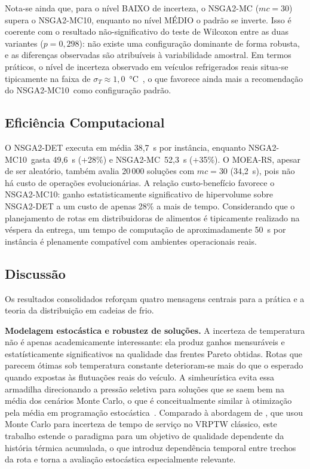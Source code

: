 \documentclass[a4paper,11pt]{article}
\newcommand{\nsmc}{NSGA2\mbox{-}MC\xspace}
\newcommand{\nsmx}{NSGA2\mbox{-}MC10\xspace}
\newcommand{\nsdet}{NSGA2\mbox{-}DET\xspace}
\newcommand{\moers}{MOEA\mbox{-}RS\xspace}
\begin{document}
Nota-se ainda que, para o nível BAIXO de incerteza, o NSGA2-MC ($mc=30$)
supera o NSGA2-MC10, enquanto no nível MÉDIO o padrão se inverte.
Isso é coerente com o resultado não-significativo do teste de Wilcoxon
entre as duas variantes ($p=0{,}298$): não existe uma configuração
dominante de forma robusta, e as diferenças observadas são atribuíveis
à variabilidade amostral.
Em termos práticos, o nível de incerteza observado em veículos refrigerados
reais situa-se tipicamente na faixa de $\sigma_T \approx 1{,}0$~°C~\citep{taoukis:1997},
o que favorece ainda mais a recomendação do \nsmx~como configuração padrão.

\subsection{Efici\^encia Computacional}

O \nsdet executa em média 38,7~s por inst\^ancia, enquanto \nsmx~gasta
49,6~s (+28\%) e \nsmc~52,3~s (+35\%).
O \moers, apesar de ser aleatório, também avalia 20\,000 soluções com
$mc=30$ (34,2~s), pois não há custo de operações evolucionárias.
A relação custo-benefício favorece o \nsmx: ganho estatisticamente
significativo de hipervolume sobre \nsdet a um custo de apenas 28\% a mais
de tempo.
Considerando que o planejamento de rotas em distribuidoras de alimentos é
tipicamente realizado na véspera da entrega, um tempo de computação de
aproximadamente 50~s por inst\^ancia é plenamente compatível com
ambientes operacionais reais.

\subsection{Discussão}

Os resultados consolidados reforçam quatro mensagens centrais para a prática
e a teoria da distribuição em cadeias de frio.

\textbf{Modelagem estocástica e robustez de soluções.}
A incerteza de temperatura não é apenas academicamente interessante:
ela produz ganhos mensuráveis e estatísticamente significativos na qualidade
das frentes Pareto obtidas.
Rotas que parecem ótimas sob temperatura constante deterioram-se mais do
que o esperado quando expostas às flutuações reais do veículo.
A simheurística evita essa armadilha direcionando a pressão seletiva para
soluções que se saem bem na média dos cenários Monte Carlo,
o que é conceitualmente similar à otimização pela média em
programação estocástica~\citep{juan:2015}.
Comparado à abordagem de \citet{juan:2011}, que usou Monte Carlo para
incerteza de tempo de serviço no VRPTW clássico, este trabalho
estende o paradigma para um objetivo de qualidade dependente da história
térmica acumulada, o que introduz depend\^encia temporal entre trechos
da rota e torna a avaliação estocástica especialmente relevante.
\end{document}
